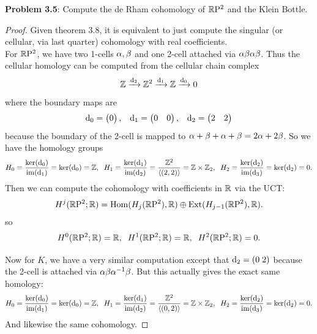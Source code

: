 \documentclass{amsart}
\begin{document}
	\newpage 
	
	\textbf{Problem 3.5}: Compute the de Rham cohomology of $\mathbb{R}\mathrm{P}^2$ and the Klein Bottle.
	
	\begin{proof}
		Given theorem 3.8, it is equivalent to just compute the singular (or cellular, via last quarter) cohomology with real coefficients.\\
		
		For $\mathbb{R}\mathrm{P}^2$, we have two 1-cells $\alpha,\beta$ and one 2-cell attached via $\alpha\beta\alpha\beta$. Thus the cellular homology can be computed from the cellular chain complex
		$$
		\mathbb{Z} \xrightarrow{\textrm{d}_2} \mathbb{Z}^2 \xrightarrow{\textrm{d}_1} \mathbb{Z} \xrightarrow{\textrm{d}_0} 0
		$$
		where the boundary maps are 
		$$
		\textrm{d}_0 = \begin{pmatrix} 0
		\end{pmatrix}, \;\;\; \textrm{d}_1 = \begin{pmatrix}
		0 & 0
		\end{pmatrix}, \;\;\; \textrm{d}_2 = \begin{pmatrix}
		2 & 2
		\end{pmatrix}
		$$
		because the boundary of the 2-cell is mapped to $\alpha + \beta + \alpha + \beta = 2\alpha + 2\beta$. So we have the homology groups
		$$
		H_0 = \frac{\ker(\textrm{d}_0)}{\operatorname{im}(\textrm{d}_1)} = \ker(\textrm{d}_0) = \mathbb{Z}, \;\; H_1 = \frac{\ker(\textrm{d}_1)}{\operatorname{im}(\textrm{d}_2)} = \frac{\mathbb{Z}^2}{\langle(2,2)\rangle} = \mathbb{Z}\times \mathbb{Z}_2, \;\; H_2 = \frac{\ker(\textrm{d}_2)}{\operatorname{im}(\textrm{d}_3)} = \ker(\textrm{d}_2) = 0.
		$$
		Then we can compute the cohomology with coefficients in $\mathbb{R}$ via the UCT:
		$$
		H^j(\mathbb{R}\mathrm{P}^2;\mathbb{R}) = \operatorname{Hom}(H_j(\mathbb{R}\mathrm{P}^2),\mathbb{R}) \oplus \operatorname{Ext}(H_{j-1}(\mathbb{R}\mathrm{P}^2),\mathbb{R}).
		$$
		so 
		$$
		H^0(\mathbb{R}\mathrm{P}^2;\mathbb{R}) = \mathbb{R}, \;\; H^1(\mathbb{R}\mathrm{P}^2;\mathbb{R}) = \mathbb{R}, \;\; H^2(\mathbb{R}\mathrm{P}^2;\mathbb{R}) = 0.
		$$
		
		Now for $K$, we have a very similar computation except that $\textrm{d}_2 = (0 \; 2)$ because the 2-cell is attached via $\alpha\beta\alpha^{-1}\beta$. But this actually gives the exact same homology:
		$$
		H_0 = \frac{\ker(\textrm{d}_0)}{\operatorname{im}(\textrm{d}_1)} = \ker(\textrm{d}_0) = \mathbb{Z}, \;\; H_1 = \frac{\ker(\textrm{d}_1)}{\operatorname{im}(\textrm{d}_2)} = \frac{\mathbb{Z}^2}{\langle(0,2)\rangle} = \mathbb{Z}\times \mathbb{Z}_2, \;\; H_2 = \frac{\ker(\textrm{d}_2)}{\operatorname{im}(\textrm{d}_3)} = \ker(\textrm{d}_2) = 0.
		$$
		And likewise the same cohomology.
	\end{proof} 
	
	\newpage 
	
\end{document}
